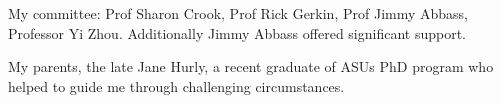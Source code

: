 
My committee: Prof Sharon Crook, Prof  Rick Gerkin, Prof Jimmy Abbass, Professor Yi Zhou. Additionally Jimmy Abbass offered significant support.

My parents, the late Jane Hurly, a recent graduate of ASUs PhD program who helped to guide me through challenging circumstances.
